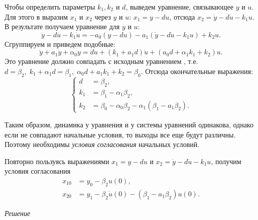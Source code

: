\documentclass[../../TAU.tex]{subfiles}
\begin{document}
    Чтобы определить параметры $k_1,k_2$ и $d$, выведем уравнение, связывающее $y$ и $u$. Для этого в  выразим $x_1$ и $x_2$ через $y$ и $u$:
    $x_1 = y - du$, 
    отсюда 
    $x_2 = \dot y - d\dot u -k_1 u$. 
    В результате получаем уравнение для $y$ и $u$:
    $$
        \ddot y - d \ddot u -k_1\dot u = -a_0 (y-du)-a_1(\dot y - d \dot u - k_1 u)+k_2u.
    $$
    Сгруппируем и приведем подобные:
    $$
        \ddot y +a_1\dot y + \alpha_0 y = d\ddot u + (k_1+a_1d)\dot u + (a_0 d + \alpha_1k_1+k_2)u.
    $$
    Это уравнение должно совпадать с исходным уравнением , т.е.
    $d = \beta_2,\; k_1 + \alpha_1d = \beta_1,\; \alpha_0 d+a_1k_1+k_2 = \beta_0$. 
    Отсюда окончательные выражения:
    $$
        \left\{
        \begin{aligned}
            d&=\beta_2,\\
            k_1 &= \beta_1 - \alpha_1\beta_2,\\
            k_2 &= \beta_0 - \alpha_0 \beta_2 - \alpha_1 (\beta_1-a_1\beta_2).
        \end{aligned}
        \right.
    $$

    Таким образом, динамика у уравнения  и у системы уравнений  одинакова, однако если не совпадают начальные условия, то выходы все еще будут различны. Поэтому необходимы {\it условия согласования} начальных условий.

    Повторно пользуясь выражениями 
    $x_1 = y - du$ 
    и 
    $x_2 = \dot y - d\dot u -k_1 u$, 
    получим условия согласования
    $$
        \begin{aligned}
            x_{10} &= y_0- \beta_2 u(0),\\
            x_{20} &= y_1-\beta_2\dot u (0) - (\beta_1-a_1\beta_2)u(0).
        \end{aligned}
    $$

    \textit{Решение}
    
\end{document}

